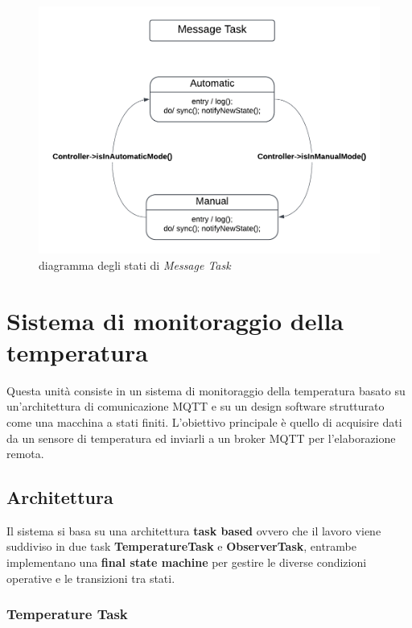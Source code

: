 \documentclass{report}
\begin{document}
\begin{itemize}
{\begin{figure}[H]
        \includegraphics[width=\linewidth]{img/assignment-03/MessageTask.png}
        \caption{diagramma degli stati di \textit{Message Task}}
        \label{fig:message-task}
    \end{figure}
    }
\end{itemize}
%
\chapter{Sistema di monitoraggio della temperatura}
\par{
    Questa unità consiste in un sistema di monitoraggio della temperatura basato su un'architettura di comunicazione MQTT e su un design software strutturato come una macchina a stati finiti. L'obiettivo principale è quello di acquisire dati da un sensore di temperatura ed inviarli a un broker MQTT per l'elaborazione remota.
}

\section{Architettura}

\par{
    Il sistema si basa su una architettura \textbf{task based} ovvero che il lavoro viene suddiviso in due task \textbf{TemperatureTask} e \textbf{ObserverTask}, entrambe implementano una \textbf{final state machine} per gestire le diverse condizioni operative e le transizioni tra stati. 
}
\subsection{Temperature Task}
\end{document}
